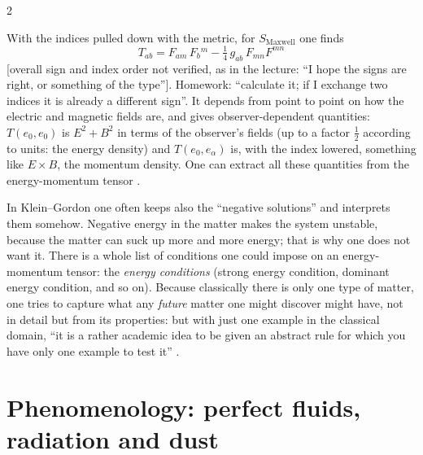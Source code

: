 \begin{paracol}{2}
\begin{example}\label{ex:c14-tmaxwell}
With the indices pulled down with the metric, for $S_{\mathrm{Maxwell}}$ one finds
\[
  T_{ab}=F_{am}\,F_b{}^m-\tfrac14\,g_{ab}\,F_{mn}F^{mn}
\]
[overall sign and index order not verified, as in the lecture: ``I hope the signs are right, or something of the type'']. Homework: ``calculate it; if I exchange two indices it is already a different sign''. It depends from point to point on how the electric and magnetic fields are, and gives observer-dependent quantities: $T(e_0,e_0)$ is $E^2+B^2$ in terms of the observer's fields (up to a factor $\tfrac12$ according to units: the energy density) and $T(e_0,e_\alpha)$ is, with the index lowered, something like $E\times B$, the momentum density. One can extract all these quantities from the energy-momentum tensor .
\end{example}
\begin{coursenote}
In Klein--Gordon one often keeps also the ``negative solutions'' and interprets them somehow. Negative energy in the matter makes the system unstable, because the matter can suck up more and more energy; that is why one does not want it. There is a whole list of conditions one could impose on an energy-momentum tensor: the \emph{energy conditions} (strong energy condition, dominant energy condition, and so on). Because classically there is only one type of matter, one tries to capture what any \emph{future} matter one might discover might have, not in detail but from its properties: but with just one example in the classical domain, ``it is a rather academic idea to be given an abstract rule for which you have only one example to test it'' .
\end{coursenote}

\section{Phenomenology: perfect fluids, radiation and dust}\label{sec:c14-fluid}


\end{paracol}
